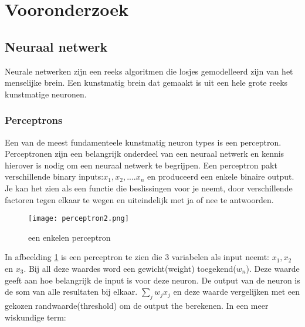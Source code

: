 \section{Vooronderzoek}

\subsection{Neuraal netwerk}
Neurale netwerken zijn een reeks algoritmen die losjes gemodelleerd zijn van het menselijke brein. Een kunstmatig brein dat gemaakt is uit een hele grote reeks kunstmatige neuronen.

\subsubsection{Perceptrons}
Een van de meest fundamenteele kunstmatig neuron types is een perceptron.\cite{Perceptron1} Perceptronen zijn een belangrijk onderdeel van een neuraal netwerk en kennis hierover is nodig om een neuraal netwerk te begrijpen. Een perceptron pakt verschillende binary inputs:$x_{1}, x_{2},....x_{n}$ en produceerd een enkele binaire output. Je kan het zien als een functie die beslissingen voor je neemt, door verschillende factoren tegen elkaar te wegen en uiteindelijk met ja of nee te antwoorden.
\begin{figure}[h!]
\centering
\texttt{[image: perceptron2.png]}
\caption{een enkelen perceptron}
\label{peceptron2}
\end{figure}
\linebreak
In afbeelding \ref{peceptron2} is een perceptron te zien die 3 variabelen als input neemt: $x_{1}, x_{2}$ en $x_{3}.$ Bij all deze waardes word een gewicht(weight) toegekend($w_{n}$). Deze waarde geeft aan hoe belangrijk de input is voor deze neuron. De output van de neuron is de som van alle resultaten bij elkaar. $\sum_{j}w_{j}x_{j}$ en deze waarde vergelijken met een gekozen randwaarde(threshold) om de output the berekenen. In een meer wiskundige term:

